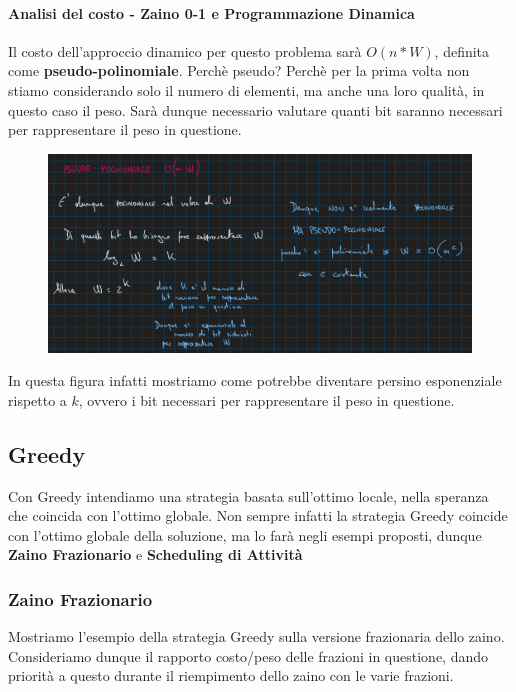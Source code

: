\documentclass{article}
\begin{document}
\newpage

\paragraph{Analisi del costo - Zaino 0-1 e Programmazione Dinamica} Il costo dell'approccio dinamico per questo problema sarà $O(n*W)$, definita come \textbf{pseudo-polinomiale}. Perchè pseudo? Perchè per la prima volta non stiamo considerando solo il numero di elementi, ma anche una loro qualità, in questo caso il peso. Sarà dunque necessario valutare quanti bit saranno necessari per rappresentare il peso in questione.

\begin{figure}[htbp]
        \center
        \includegraphics[scale=0.3]{img/zaino6.png}
\end{figure}

In questa figura infatti mostriamo come potrebbe diventare persino esponenziale rispetto a $k$, ovvero i bit necessari per rappresentare il peso in questione.

\subsection{Greedy}

Con Greedy intendiamo una strategia basata sull'ottimo locale, nella speranza che coincida con l'ottimo globale. Non sempre infatti la strategia Greedy coincide con l'ottimo globale della soluzione, ma lo farà negli esempi proposti, dunque \textbf{Zaino Frazionario} e \textbf{Scheduling di Attività}

\subsubsection{Zaino Frazionario} Mostriamo l'esempio della strategia Greedy sulla versione frazionaria dello zaino. Consideriamo dunque il rapporto costo/peso delle frazioni in questione, dando priorità a questo durante il riempimento dello zaino con le varie frazioni.
\end{document}
